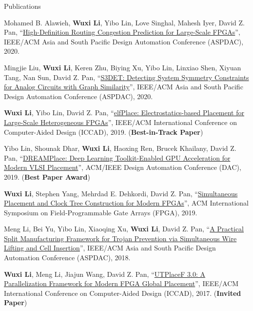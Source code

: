 \begin{rSection}{Publications}
\begin{description}[font=\normalfont]
\item[{[C10]}]{
    Mohamed B. Alawieh, \textbf{Wuxi Li}, Yibo Lin, Love Singhal, Mahesh Iyer, David Z. Pan,
    ``\href{https://ieeexplore.ieee.org/document/9045178}{High-Definition Routing Congestion Prediction for Large-Scale FPGAs}'',
    IEEE/ACM Asia and South Pacific Design Automation Conference (ASPDAC), 2020.
}

\item[{[C9]}]{
    Mingjie Liu, \textbf{Wuxi Li}, Keren Zhu, Biying Xu, Yibo Lin, Linxiao Shen, Xiyuan Tang, Nan Sun, David Z. Pan,
    ``\href{https://ieeexplore.ieee.org/document/9045109}{S3DET: Detecting System Symmetry Constraints for Analog Circuits with Graph Similarity}'',
    IEEE/ACM Asia and South Pacific Design Automation Conference (ASPDAC), 2020.
}

\item[{[C8]}]{
    \textbf{Wuxi Li}, Yibo Lin, David Z. Pan,
    ``\href{https://ieeexplore.ieee.org/document/8942075}{elfPlace: Electrostatics-based Placement for Large-Scale Heterogeneous FPGAs}'',
    IEEE/ACM International Conference on Computer-Aided Design (ICCAD), 2019.
    (\textbf{Best-in-Track Paper})
}

\item[{[C7]}]{
    Yibo Lin, Shounak Dhar, \textbf{Wuxi Li}, Haoxing Ren, Brucek Khailany, David Z. Pan,
    ``\href{https://dl.acm.org/citation.cfm?id=3317803}{DREAMPlace: Deep Learning Toolkit-Enabled GPU Acceleration for Modern VLSI Placement}'',
    ACM/IEEE Design Automation Conference (DAC), 2019.
    (\textbf{Best Paper Award})
}

\item[{[C6]}]{
    \textbf{Wuxi Li}, Stephen Yang, Mehrdad E. Dehkordi, David Z. Pan,
    ``\href{https://dl.acm.org/citation.cfm?id=3293897}{Simultaneous Placement and Clock Tree Construction for Modern FPGAs}'',
    ACM International Symposium on Field-Programmable Gate Arrays (FPGA), 2019.
}

\item[{[C5]}]{
    Meng Li, Bei Yu, Yibo Lin, Xiaoqing Xu, \textbf{Wuxi Li}, David Z. Pan,
    ``\href{https://ieeexplore.ieee.org/document/8297316}{A Practical Split Manufacturing Framework for Trojan Prevention via Simultaneous Wire Lifting and Cell Insertion}'',
    IEEE/ACM Asia and South Pacific Design Automation Conference (ASPDAC), 2018.
}

\item[{[C4]}]{
    \textbf{Wuxi Li}, Meng Li, Jiajun Wang, David Z. Pan,
    ``\href{https://ieeexplore.ieee.org/abstract/document/8203879/}{UTPlaceF 3.0: A Parallelization Framework for Modern FPGA Global Placement}'',
    IEEE/ACM International Conference on Computer-Aided Design (ICCAD), 2017.
    (\textbf{Invited Paper})
}


\end{description}
\end{rSection}
